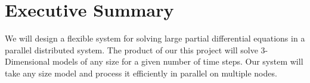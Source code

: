 \section*{Executive Summary}
We will design a flexible system for solving large partial differential equations in a parallel distributed system.  The product of our this project will solve 3-Dimensional models of any size for a given number of time steps.  Our system will take any size model and process it efficiently in parallel on multiple nodes.

